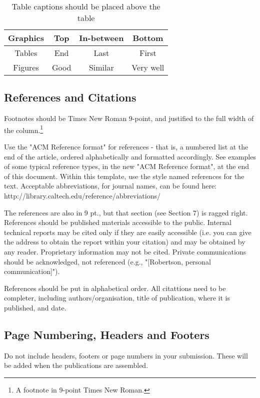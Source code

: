\documentclass{sig-alternate-br}
\begin{document}
\begin{table}
\centering \caption{Table captions should be placed above the table}
\begin{tabular}{|c|c|c|c|} \hline
\textbf{Graphics} & \textbf{Top} & \textbf{In-between} & \textbf{Bottom}\\ \hline 
Tables&End&Last&First\\ \hline 
Figures&Good&Similar&Very well\\
\hline\end{tabular}
\end{table}

\subsection{References and Citations}
Footnotes should be Times New Roman 9-point, and justified to the 
full width of the column.\footnote{A footnote in 9-point Times New Roman.}

Use the "ACM Reference format" for references - that is, a numbered 
list at the end of the article, ordered alphabetically and formatted 
accordingly. See examples of some typical reference types, in the new 
"ACM Reference format", at the end of this document. Within this 
template, use the style named references for the text. Acceptable 
abbreviations, for journal names, can be found here: 
http://library.caltech.edu/reference/abbreviations/

The references are also in 9 pt., but that section (see Section 7) is 
ragged right. References should be published materials accessible to 
the public. Internal technical reports may be cited only if they are 
easily accessible (i.e. you can give the address to obtain the report 
within your citation) and may be obtained by any reader. Proprietary
information may not be cited. Private communications should be 
acknowledged, not referenced  (e.g., "[Robertson, personal communication]"). 

References should be put in alphabetical order. All citattions need to be completer, including authors/organisation, title of publication, where it is published, and date.

\subsection{Page Numbering, Headers and Footers}
Do not include headers, footers or page numbers in your submission. 
These will be added when the publications are assembled.
\end{document}
